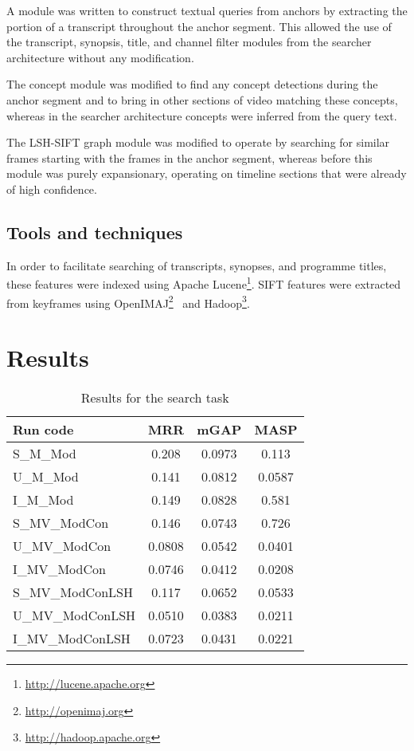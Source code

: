 \documentclass{../acm_proc_article-me11_tweaked}
\begin{document}
A module was written to construct textual queries from anchors by extracting 
the portion of a transcript throughout the anchor segment. This allowed the 
use of the transcript, synopsis, title, and channel filter modules from the 
searcher architecture without any modification.

The concept module was modified to find any concept detections during the 
anchor segment and to bring in other sections of video matching these 
concepts, whereas in the searcher architecture concepts were inferred from the 
query text.

The LSH-SIFT graph module was modified to operate by searching for similar 
frames starting with the frames in the anchor segment, whereas before this 
module was purely expansionary, operating on timeline sections that were 
already of high confidence.

\subsection{Tools and techniques}
In order to facilitate searching of transcripts, synopses, and programme 
titles, these features were indexed using Apache Lucene\footnote{\url{http://lucene.apache.org}}. SIFT features were extracted from keyframes using OpenIMAJ\footnote{\url{http://openimaj.org}}~\cite{Hare:2011:OIJ:2072298.2072421} and Hadoop\footnote{\url{http://hadoop.apache.org}}.


\section{Results}

\begin{table}
	\centering
	\caption{Results for the search task}
	\label{tbl:searchresults}
\begin{tabular}{|l|c|c|c|}
\hline
\textbf{Run code} & \textbf{MRR} &
\textbf{mGAP} &
\textbf{MASP} \\
\hline
S\_M\_Mod & 0.208 & 0.0973 & 0.113 \\
U\_M\_Mod & 0.141 & 0.0812 & 0.0587 \\
I\_M\_Mod & 0.149 & 0.0828 & 0.581 \\
S\_MV\_ModCon & 0.146 & 0.0743 & 0.726 \\
U\_MV\_ModCon & 0.0808 & 0.0542 & 0.0401 \\
I\_MV\_ModCon & 0.0746 & 0.0412 & 0.0208 \\
S\_MV\_ModConLSH & 0.117 & 0.0652 & 0.0533 \\
U\_MV\_ModConLSH & 0.0510 & 0.0383 & 0.0211 \\
I\_MV\_ModConLSH & 0.0723 & 0.0431 & 0.0221 \\
\hline
\end{tabular}
\end{table}
\end{document}
